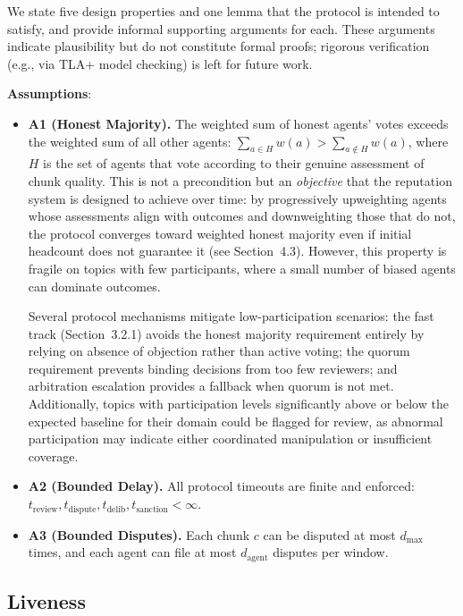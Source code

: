 \documentclass[11pt]{article}
\begin{document}
We state five design properties and one lemma that the protocol is intended to satisfy, and provide informal supporting arguments for each. These arguments indicate plausibility but do not constitute formal proofs; rigorous verification (e.g., via TLA+ model checking) is left for future work.

\textbf{Assumptions}:

\begin{itemize}
\item \textbf{A1 (Honest Majority).} The weighted sum of honest agents' votes exceeds the weighted sum of all other agents: $\sum_{a \in H} w(a) > \sum_{a \notin H} w(a)$, where $H$ is the set of agents that vote according to their genuine assessment of chunk quality. This is not a precondition but an \textit{objective} that the reputation system is designed to achieve over time: by progressively upweighting agents whose assessments align with outcomes and downweighting those that do not, the protocol converges toward weighted honest majority even if initial headcount does not guarantee it (see Section~4.3). However, this property is fragile on topics with few participants, where a small number of biased agents can dominate outcomes.

Several protocol mechanisms mitigate low-participation scenarios: the fast track (Section~3.2.1) avoids the honest majority requirement entirely by relying on absence of objection rather than active voting; the quorum requirement prevents binding decisions from too few reviewers; and arbitration escalation provides a fallback when quorum is not met. Additionally, topics with participation levels significantly above or below the expected baseline for their domain could be flagged for review, as abnormal participation may indicate either coordinated manipulation or insufficient coverage.

\item \textbf{A2 (Bounded Delay).} All protocol timeouts are finite and enforced: $t_{\text{review}}, t_{\text{dispute}}, t_{\text{delib}}, t_{\text{sanction}} < \infty$.

\item \textbf{A3 (Bounded Disputes).} Each chunk $c$ can be disputed at most $d_{\max}$ times, and each agent can file at most $d_{\text{agent}}$ disputes per window.
\end{itemize}

\subsection{Liveness}
\end{document}
